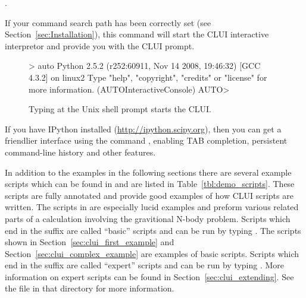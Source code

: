 \documentclass[12pt]{report}
\begin{document}
 \centerline {.}

 If your command search path has been correctly set (see
 Section~\ref{sec:Installation}), this command will start the \AUTO CLUI
 interactive interpretor and provide you with the \AUTO CLUI prompt.

 \begin{figure}[htbp]
 {\small 
 \begin{center} \begin{boxedverbatim}
 > auto
 Python 2.5.2 (r252:60911, Nov 14 2008, 19:46:32) 
 [GCC 4.3.2] on linux2
 Type "help", "copyright", "credits" or "license" for more information.
 (AUTOInteractiveConsole)
 AUTO>
 \end{boxedverbatim}
 \end{center}
 }
 \caption[Starting the \AUTO CLUI.]
 {Typing  at the Unix shell prompt starts the
 \AUTO CLUI.  }
 \label{exa:clui_starting}
 \end{figure}

 If you have IPython installed (\url{http://ipython.scipy.org}), then
 you can get a friendlier interface using the command
 , enabling TAB completion, persistent command-line
 history and other features.

 In addition to the examples in the following sections there are
 several example scripts which can be found in
  and are listed in
 Table~\ref{tbl:demo_scripts}.  These scripts are fully annotated and
 provide good examples of how \AUTO CLUI scripts are written.  The
 scripts in  are especially lucid
 examples and preform various related parts of a calculation involving
 the gravitional N-body problem.  
 Scripts which end in the
 suffix  are called ``basic'' scripts and can
 be run by typing .
 The scripts shown in Section~\ref{sec:clui_first_example}
 and Section~\ref{sec:clui_complex_example} are examples
 of basic scripts.
 Scripts which end in the
 suffix  are called ``expert'' scripts and can
 be run by typing .
 More information on expert scripts can be 
 found in Section~\ref{sec:clui_extending}.
 See the  file in that
 directory for more information.
\end{document}
